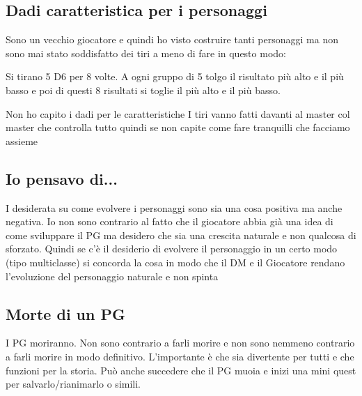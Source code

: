 \subsection{Dadi caratteristica per i personaggi}
Sono un vecchio giocatore e quindi ho visto costruire tanti personaggi ma non sono mai stato soddisfatto dei tiri a meno di fare in questo modo:

Si tirano 5 D6 per 8 volte. A ogni gruppo di 5 tolgo il risultato più alto e il più basso e poi di questi 8 risultati si toglie il più alto e il più basso.

\begin{DndComment}{Non ho capito i dadi per le caratteristiche}
I tiri vanno fatti davanti al master col master che controlla tutto quindi se non capite come fare tranquilli che facciamo assieme
\end{DndComment}

\subsection{Io pensavo di...}
I desiderata su come evolvere i personaggi sono sia una cosa positiva ma anche negativa.
Io non sono contrario al fatto che il giocatore abbia già una idea di come sviluppare il PG ma desidero che sia una crescita naturale e non qualcosa di sforzato. Quindi se c'è il desiderio di evolvere il personaggio in un certo modo (tipo multiclasse) si concorda la cosa in modo che il DM e il Giocatore rendano l'evoluzione del personaggio naturale e non spinta

\subsection{Morte di un PG}
I PG moriranno. Non sono contrario a farli morire e non sono nemmeno contrario a farli morire in modo definitivo. L'importante è che sia divertente per tutti e che funzioni per la storia. Può anche succedere che il PG muoia e inizi una mini quest per salvarlo/rianimarlo o simili.
